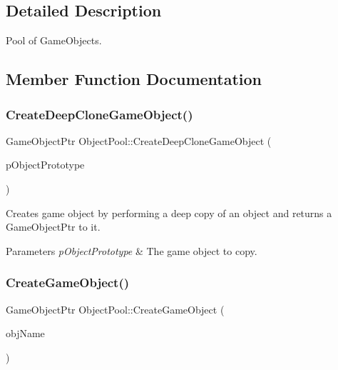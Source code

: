 \subsection{Detailed Description}
Pool of Game\+Objects. 

\subsection{Member Function Documentation}
\mbox{\label{class_object_pool_a49990f34429a9468b2b2344765ac75dd}} 
\subsubsection{\texorpdfstring{Create\+Deep\+Clone\+Game\+Object()}{CreateDeepCloneGameObject()}}
{\footnotesize\ttfamily Game\+Object\+Ptr Object\+Pool\+::\+Create\+Deep\+Clone\+Game\+Object (\begin{DoxyParamCaption}\item[{\mbox{\hyperlink{class_game_object}{Game\+Object}} $\ast$}]{p\+Object\+Prototype }\end{DoxyParamCaption})}



Creates game object by performing a deep copy of an object and returns a Game\+Object\+Ptr to it. 


\begin{DoxyParams}{Parameters}
{\em p\+Object\+Prototype} & The game object to copy. \\
\hline
\end{DoxyParams}
\mbox{\label{class_object_pool_acbae5f0774df14a2ddccc0786c3863c3}} 
\subsubsection{\texorpdfstring{Create\+Game\+Object()}{CreateGameObject()}}
{\footnotesize\ttfamily Game\+Object\+Ptr Object\+Pool\+::\+Create\+Game\+Object (\begin{DoxyParamCaption}\item[{const std\+::string \&}]{obj\+Name }\end{DoxyParamCaption})}



